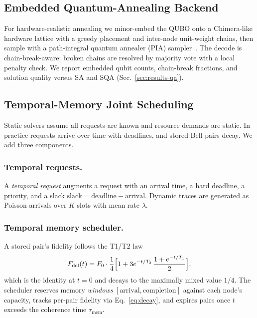 \documentclass[twocolumn]{article}
\begin{document}
\subsection{Embedded Quantum-Annealing Backend}
\label{sec:qa}

For hardware-realistic annealing we minor-embed the QUBO onto a
Chimera-like hardware lattice with a greedy placement and inter-node
unit-weight chains, then sample with a path-integral quantum annealer
(PIA) sampler~\cite{openjij,venegas2018quantum}.  The decode is
chain-break-aware: broken chains are resolved by majority vote with a
local penalty check.  We report embedded qubit counts, chain-break
fractions, and solution quality versus SA and SQA
(Sec.~\ref{sec:results-qa}).

\subsection{Temporal-Memory Joint Scheduling}
\label{sec:joint}

Static solvers assume all requests are known and resource demands are
static.  In practice requests arrive over time with deadlines, and
stored Bell pairs decay.  We add three components.

\subsubsection{Temporal requests.}
A \emph{temporal request} augments a request with an arrival time, a
hard deadline, a priority, and a slack
$\text{slack} = \text{deadline} - \text{arrival}$.  Dynamic traces are
generated as Poisson arrivals over $K$ slots with mean rate $\lambda$.

\subsubsection{Temporal memory scheduler.}
A stored pair's fidelity follows the T1/T2 law
\begin{equation}
  \label{eq:decay}
  F_{\text{del}}(t) = F_0 \cdot \frac{1}{4}
    \Bigl[1 + 3 e^{-t/T_2}\,\frac{1 + e^{-t/T_1}}{2}\Bigr],
\end{equation}
which is the identity at $t=0$ and decays to the maximally mixed value
$1/4$.  The scheduler reserves memory \emph{windows}
$[\text{arrival},\text{completion}]$ against each node's capacity,
tracks per-pair fidelity via Eq.~\eqref{eq:decay}, and expires pairs
once $t$ exceeds the coherence time $\tau_{\text{mem}}$.
\end{document}
